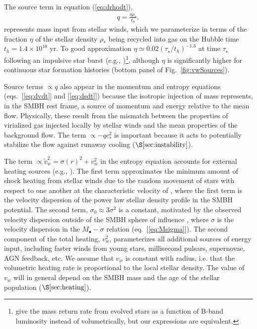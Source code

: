 \documentclass[usenatbib,fleqn]{mn2e}
\newcommand{\vw}{\tilde{v}_{w}}
\newcommand{\rhostar}{\rho_*}
\newcommand{\Mbh}[1][]{M_{\bullet#1}}
\renewcommand{\th}{t_h}
\begin{document}
The source term in equation (\ref{eq:drhodt}),
\begin{align}
  q=\frac{\eta \rhostar}{\th},
\label{eq:q}
\end{align}
represents mass input from stellar winds, which we parameterize in
terms of the fraction $\eta$ of the stellar density $\rhostar$ being
recycled into gas on the Hubble time $\th = 1.4 \times 10^{10}$ yr.
To good approximation $\eta\simeq 0.02 (\tau_{\star}/t_h)^{-1.3}$ at
time $\tau_{\star}$ following an impulsive star burst (e.g.,
\citealt{Ciotti+91})\footnote{\citet{Ciotti+91} give the mass return
  rate from evolved stars as a function of B-band luminosity instead
  of volumetrically, but our expressions are equivalent.}, although
$\eta$ is significantly higher for continuous star formation histories
(bottom panel of Fig.~\ref{fig:vwSources}).

Source terms $\propto q$ also appear in the momentum and entropy
equations (eqs.~[\ref{eq:dvdt}] and [\ref{eq:dsdt}]) because the isotropic injection of mass represents, in the SMBH rest frame, a source of momentum
and energy relative to the mean flow.  Physically, these result from
the mismatch between the properties of virialized gas injected locally
by stellar winds and the mean properties of the background flow.  The
term $\propto -q c_{s}^{2}$ is important because it acts to potentially stabilize the flow against runaway cooling ($\S\ref{sec:instability}$).

The term $\propto \vw^2 = \sigma(r)^2+v_{w}^2$ in the entropy equation
accounts for external heating sources (e.g.,
\citealt{ShcherbakovWong+:2014a}).  The first term approximates the
minimum amount of shock heating from stellar winds due to the random
movement of stars with respect to one another at the characteristic
velocity of 
\be\sigma \approx \sqrt{\frac{3 G \Mbh}{(\Gamma+2)
    r}+\sigma_0^2},
\label{eq:sigmarel}
\ee where the first term is the velocity dispersion of the power law
stellar density profile in the SMBH potential.  The second term,
$\sigma_0\approx 3 \sigma^2$ is a constant, motivated by the observed
velocity dispersion outside of the SMBH sphere of influence
\citep{ChaeBernardi+:2014a}, where $\sigma$ is the velocity dispersion
in the $\Mbh-\sigma$ relation (eq.~[\ref{eq:Msigma}]).  The second
component of the total heating, $v_{w}^{2}$, parameterizes all
additional sources of energy input, including faster winds from young
stars, millisecond pulsars, supernovae, AGN feedback, etc.  We assume
that $v_w$ is constant with radius, i.e. that the volumetric heating
rate is proportional to the local stellar density.  The value of $v_w$
will in general depend on the SMBH mass and the age of the stellar
population ($\S\ref{sec:heating}$).
\end{document}
